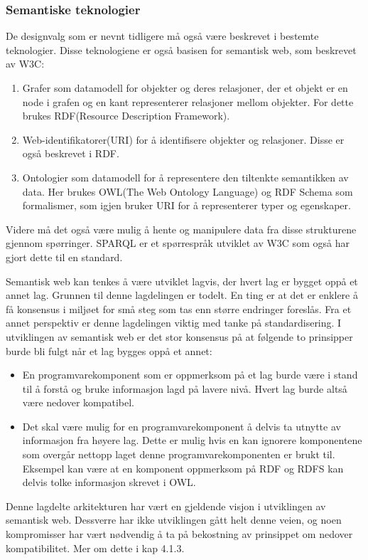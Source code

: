 \subsubsection{Semantiske teknologier}
De designvalg som er nevnt tidligere må også være beskrevet i bestemte teknologier. Disse teknologiene er også basisen for semantisk web, som beskrevet av W3C:
\begin{enumerate}
\item Grafer som datamodell for objekter og deres relasjoner, der et objekt er en node i grafen og en kant representerer relasjoner mellom objekter. For dette brukes RDF(Resource Description Framework).
\item Web-identifikatorer(URI) for å identifisere objekter og relasjoner. Disse er også beskrevet i RDF.
\item Ontologier som datamodell for å representere den tiltenkte semantikken av data. Her brukes OWL(The Web Ontology Language) og RDF Schema som formalismer, som igjen bruker URI for å representerer typer og egenskaper.
\end{enumerate}

Videre må det også være mulig å hente og manipulere data fra disse strukturene gjennom spørringer. SPARQL er et spørrespråk utviklet av W3C som også har gjort dette til en standard.  

Semantisk web kan tenkes å være utviklet lagvis, der hvert lag er bygget oppå et annet lag. Grunnen til denne lagdelingen er todelt. En ting er at det er enklere å få konsensus i miljøet for små steg som tas enn større endringer foreslås. Fra et annet perspektiv er denne lagdelingen viktig med tanke på standardisering. I utviklingen av semantisk web er det stor konsensus på at følgende to prinsipper burde bli fulgt når et lag bygges oppå et annet:
\begin{itemize}
\item En programvarekomponent som er oppmerksom på et lag burde være i stand til å forstå og bruke informasjon lagd på lavere nivå. Hvert lag burde altså være nedover kompatibel.
\item Det skal være mulig for en programvarekomponent å delvis ta utnytte av informasjon fra høyere lag. Dette er mulig hvis en kan ignorere komponentene som overgår nettopp laget denne programvarekomponenten er brukt til. Eksempel kan være at en komponent oppmerksom på RDF og RDFS kan delvis tolke informasjon skrevet i OWL. 
\end{itemize}

Denne lagdelte arkitekturen har vært en gjeldende visjon i utviklingen av semantisk web. Dessverre har ikke utviklingen gått helt denne veien, og noen kompromisser har vært nødvendig å ta på bekostning av prinsippet om nedover kompatibilitet. Mer om dette i kap 4.1.3.  %

